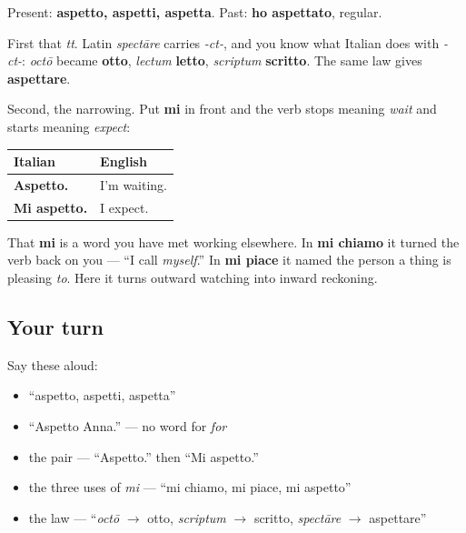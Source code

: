 \begin{grammarlens}[title={Grammar Lens: the doubled t, and the word that narrows the meaning}]
Present: \textbf{aspetto, aspetti, aspetta}. Past: \textbf{ho aspettato}, regular.

First that \emph{tt}. Latin \emph{spectāre} carries \emph{-ct-}, and you know what Italian does with \emph{-ct-}: \emph{octō} became \textbf{otto}, \emph{lectum} \textbf{letto}, \emph{scriptum} \textbf{scritto}. The same law gives \textbf{aspettare}.

Second, the narrowing. Put \textbf{mi} in front and the verb stops meaning \emph{wait} and starts meaning \emph{expect}:

\noindent
\begin{tabularx}{\linewidth}{@{}>{\raggedright\arraybackslash}X>{\raggedright\arraybackslash}X@{}}
\toprule
\textbf{Italian} & \textbf{English} \\
\midrule
\textbf{Aspetto.} & I'm waiting. \\
\textbf{Mi aspetto.} & I expect. \\
\bottomrule
\end{tabularx}

That \textbf{mi} is a word you have met working elsewhere. In \textbf{mi chiamo} it turned the verb back on you — \textquotedblleft{}I call \emph{myself}.\textquotedblright{} In \textbf{mi piace} it named the person a thing is pleasing \emph{to}. Here it turns outward watching into inward reckoning.
\end{grammarlens}

\subsection*{Your turn}
Say these aloud:

\begin{itemize}
\raggedright
  \item \textquotedblleft{}aspetto, aspetti, aspetta\textquotedblright{}
  \item \textquotedblleft{}Aspetto Anna.\textquotedblright{} — no word for \emph{for}
  \item the pair — \textquotedblleft{}Aspetto.\textquotedblright{} then \textquotedblleft{}Mi aspetto.\textquotedblright{}
  \item the three uses of \emph{mi} — \textquotedblleft{}mi chiamo, mi piace, mi aspetto\textquotedblright{}
  \item the law — \textquotedblleft{}\emph{octō} $\to$ otto, \emph{scriptum} $\to$ scritto, \emph{spectāre} $\to$ aspettare\textquotedblright{}
\end{itemize}

